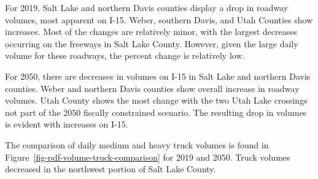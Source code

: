 \documentclass[
  letterpaper,
  DIV=11,
  numbers=noendperiod]{scrreprt}
\begin{document}
For 2019, Salt Lake and northern Davis counties display a drop in
roadway volumes, most apparent on I-15. Weber, southern Davis, and Utah
Counties show increases. Most of the changes are relatively minor, with
the largest decreases occurring on the freeways in Salt Lake County.
However, given the large daily volume for these roadways, the percent
change is relatively low.

For 2050, there are decreases in volumes on I-15 in Salt Lake and
northern Davis counties. Weber and northern Davis counties show overall
increase in roadway volumes. Utah County shows the most change with the
two Utah Lake crossings not part of the 2050 fiscally constrained
scenario. The resulting drop in volumes is evident with increases on
I-15.

The comparison of daily medium and heavy truck volumes is found in
Figure~\ref{fig-pdf-volume-truck-comparison} for 2019 and 2050. Truck
volumes decreased in the northwest portion of Salt Lake County.
\end{document}

